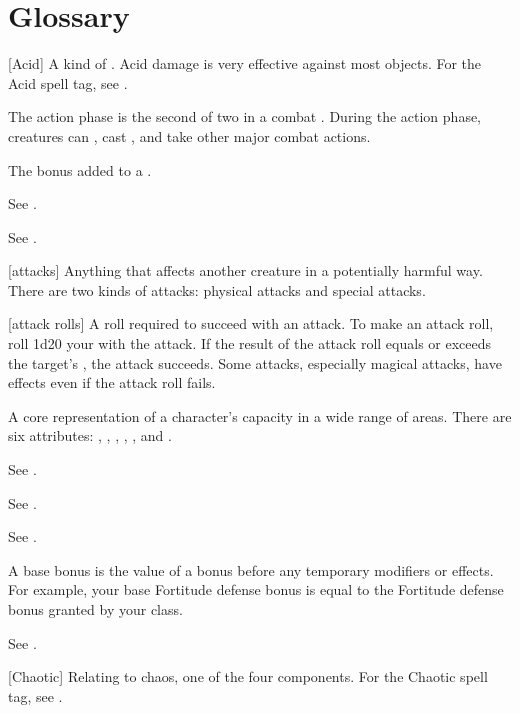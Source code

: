 \chapter{Glossary}\label{Glossary}

[Acid] A kind of . Acid damage is very effective against most objects. For the Acid spell tag, see .

 The action phase is the second of two  in a combat .
During the action phase, creatures can , cast , and take other major combat actions.

 The bonus added to a .

 See .

 See .

[attacks] Anything that affects another creature in a potentially harmful way. There are two kinds of attacks: physical attacks and special attacks.

[attack rolls] A roll required to succeed with an attack.
To make an attack roll, roll 1d20 \add your  with the attack.
If the result of the attack roll equals or exceeds the target's , the attack succeeds.
Some attacks, especially magical attacks, have effects even if the attack roll fails.

 A core representation of a character's capacity in a wide range of areas. There are six attributes: , , , , , and .

 See .

 See .

 See .

 A base bonus is the value of a bonus before any temporary modifiers or effects. For example, your base Fortitude defense bonus is equal to the Fortitude defense bonus granted by your class.

 See .

[Chaotic] Relating to chaos, one of the four  components. For the Chaotic spell tag, see .

